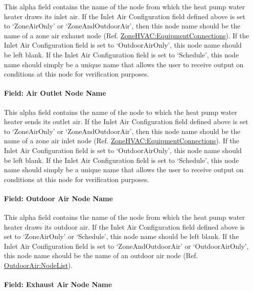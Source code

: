This alpha field contains the name of the node from which the heat pump water heater draws its inlet air. If the Inlet Air Configuration field defined above is set to `ZoneAirOnly' or `ZoneAndOutdoorAir', then this node name should be the name of a zone air exhaust node (Ref. \hyperref[zonehvacequipmentconnections]{ZoneHVAC:EquipmentConnections}). If the Inlet Air Configuration field is set to `OutdoorAirOnly', this node name should be left blank. If the Inlet Air Configuration field is set to `Schedule', this node name should simply be a unique name that allows the user to receive output on conditions at this node for verification purposes.

\paragraph{Field: Air Outlet Node Name}\label{field-air-outlet-node-name-007}

This alpha field contains the name of the node to which the heat pump water heater sends its outlet air. If the Inlet Air Configuration field defined above is set to `ZoneAirOnly' or `ZoneAndOutdoorAir', then this node name should be the name of a zone air inlet node (Ref. \hyperref[zonehvacequipmentconnections]{ZoneHVAC:EquipmentConnections}). If the Inlet Air Configuration field is set to `OutdoorAirOnly', this node name should be left blank. If the Inlet Air Configuration field is set to `Schedule', this node name should simply be a unique name that allows the user to receive output on conditions at this node for verification purposes.

\paragraph{Field: Outdoor Air Node Name}\label{field-outdoor-air-node-name-000}

This alpha field contains the name of the node from which the heat pump water heater draws its outdoor air. If the Inlet Air Configuration field defined above is set to `ZoneAirOnly' or `Schedule', this node name should be left blank. If the Inlet Air Configuration field is set to `ZoneAndOutdoorAir' or `OutdoorAirOnly', this node name should be the name of an outdoor air node (Ref. \hyperref[outdoorairnodelist]{OutdoorAir:NodeList}).

\paragraph{Field: Exhaust Air Node Name}\label{field-exhaust-air-node-name}

